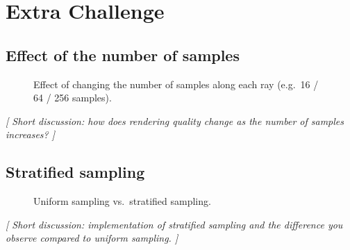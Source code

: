 \documentclass[11pt]{article}
\begin{document}
\section{Extra Challenge}

\subsection{Effect of the number of samples}
\begin{figure}[h]
    \centering
    \caption{Effect of changing the number of samples along each ray
    (e.g.\ 16 / 64 / 256 samples).}
    \label{fig:samples}
\end{figure}

\noindent\textit{[ Short discussion: how does rendering quality change as the number of
samples increases? ]}

\subsection{Stratified sampling}
\begin{figure}[h]
    \centering
    \caption{Uniform sampling vs.\ stratified sampling.}
    \label{fig:stratified}
\end{figure}

\noindent\textit{[ Short discussion: implementation of stratified sampling and the difference
you observe compared to uniform sampling. ]}
\end{document}
